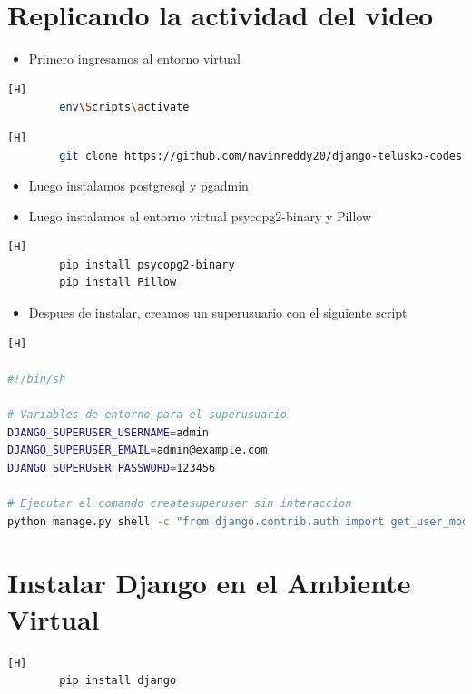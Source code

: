 \documentclass{article}
\begin{document}
\section{Replicando la actividad del video}
	\begin{itemize}
		\item Primero ingresamos al entorno virtual
	\end{itemize}
	\begin{lstlisting}[language=bash,caption={Activar el ambiente virtual}][H]
		env\Scripts\activate
	\end{lstlisting}
	\begin{lstlisting}[language=bash,caption={Clonar el repositorio}][H]
		git clone https://github.com/navinreddy20/django-telusko-codes
	\end{lstlisting}
	\begin{itemize}
		\item Luego instalamos postgresql y pgadmin 
		\item Luego instalamos al entorno virtual psycopg2-binary y Pillow
	\end{itemize}
	\begin{lstlisting}[language=bash,caption={Instalando psycopg2-binary y Pillow}][H]
		pip install psycopg2-binary
		pip install Pillow
	\end{lstlisting}
	\begin{itemize}
		\item  Despues de instalar, creamos un superusuario con el siguiente script
	\end{itemize}
\begin{lstlisting}[language=bash,caption={Script para crear un superusuario}][H]

#!/bin/sh

# Variables de entorno para el superusuario
DJANGO_SUPERUSER_USERNAME=admin
DJANGO_SUPERUSER_EMAIL=admin@example.com
DJANGO_SUPERUSER_PASSWORD=123456

# Ejecutar el comando createsuperuser sin interaccion
python manage.py shell -c "from django.contrib.auth import get_user_model; User = get_user_model(); User.objects.create_superuser('$DJANGO_SUPERUSER_USERNAME', '$DJANGO_SUPERUSER_EMAIL', '$DJANGO_SUPERUSER_PASSWORD') if not User.objects.filter(username='$DJANGO_SUPERUSER_USERNAME').exists() else print('Superusuario ya existe.')"
	\end{lstlisting}

\section{Instalar Django en el Ambiente Virtual}
	\begin{lstlisting}[language=bash,caption={Instalar Django}][H]
		pip install django
	\end{lstlisting}
\end{document}
